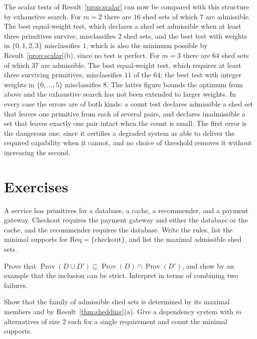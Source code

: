 The scalar tests of Result~\ref{prop:scalar} can now be compared with this structure by exhaustive search. For $m=2$ there are $16$ shed sets of which $7$ are admissible. The best equal-weight test, which declares a shed set admissible when at least three primitives survive, misclassifies $2$ shed sets, and the best test with weights in $\{0,1,2,3\}$ misclassifies $1$, which is also the minimum possible by Result~\ref{prop:scalar}(b), since no test is perfect. For $m=3$ there are $64$ shed sets of which $37$ are admissible. The best equal-weight test, which requires at least three surviving primitives, misclassifies $11$ of the $64$; the best test with integer weights in $\{0,\dots,5\}$ misclassifies $8$. The latter figure bounds the optimum from above and the exhaustive search has not been extended to larger weights. In every case the errors are of both kinds: a count test declares admissible a shed set that leaves one primitive from each of several pairs, and declares inadmissible a set that leaves exactly one pair intact when the count is small. The first error is the dangerous one, since it certifies a degraded system as able to deliver the required capability when it cannot, and no choice of threshold removes it without increasing the second.

\section*{Exercises}

\begin{exercise}
A service has primitives for a database, a cache, a recommender, and a payment gateway. Checkout requires the payment gateway and either the database or the cache, and the recommender requires the database. Write the rules, list the minimal supports for $\mathrm{Req}=\{\text{checkout}\}$, and list the maximal admissible shed sets.
\end{exercise}

\begin{exercise}
Prove that $\operatorname{Prov}(D\cup D')\subseteq\operatorname{Prov}(D)\cap\operatorname{Prov}(D')$, and show by an example that the inclusion can be strict. Interpret in terms of combining two failures.
\end{exercise}

\begin{exercise}
Show that the family of admissible shed sets is determined by its maximal members and by Result~\ref{thm:shedding}(a). Give a dependency system with $m$ alternatives of size $2$ each for a single requirement and count the minimal supports.
\end{exercise}

